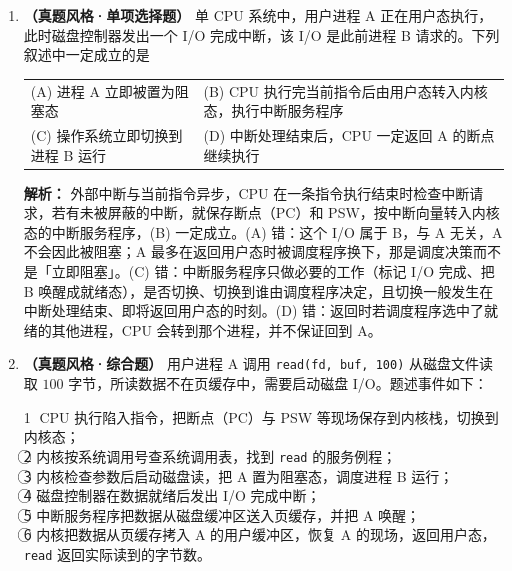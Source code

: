 \begin{enumerate}[resume]
总完成时间为 $110$ ms。CPU 忙碌时间为 $20+10+20+10+20+20=100$ ms，故利用率为
\[
\frac{100}{110}\approx 0.909,
\]
即 $90.9\%$。作为对照，单道执行的利用率为 $100/190\approx52.6\%$：多道的作用正是用另一道作业填补 I/O 造成的 CPU 空档，本题中空闲时间由 $90$ ms 压缩到 $10$ ms。

（3）三道作业都在 $0$ 时刻到达，周转时间就等于完成时刻：J1 为 $70$ ms，J2 为 $90$ ms，J3 为 $110$ ms，平均 $(70+90+110)/3=90$ ms。

\else \answerarea[10] \fi

\vspace{8pt}

\item \textbf{（真题风格·单项选择题）} 单 CPU 系统中，用户进程 A 正在用户态执行，此时磁盘控制器发出一个 I/O 完成中断，该 I/O 是此前进程 B 请求的。下列叙述中一定成立的是
\begin{center}
\begin{tabularx}{\linewidth}{@{}XX@{}}
(A) 进程 A 立即被置为阻塞态 & (B) CPU 执行完当前指令后由用户态转入内核态，执行中断服务程序 \\[4pt]
(C) 操作系统立即切换到进程 B 运行 & (D) 中断处理结束后，CPU 一定返回 A 的断点继续执行
\end{tabularx}
\end{center}

\ifshowsolutions\par\noindent\textbf{解析：} 外部中断与当前指令异步，CPU 在一条指令执行结束时检查中断请求，若有未被屏蔽的中断，就保存断点（PC）和 PSW，按中断向量转入内核态的中断服务程序，(B) 一定成立。(A) 错：这个 I/O 属于 B，与 A 无关，A 不会因此被阻塞；A 最多在返回用户态时被调度程序换下，那是调度决策而不是「立即阻塞」。(C) 错：中断服务程序只做必要的工作（标记 I/O 完成、把 B 唤醒成就绪态），是否切换、切换到谁由调度程序决定，且切换一般发生在中断处理结束、即将返回用户态的时刻。(D) 错：返回时若调度程序选中了就绪的其他进程，CPU 会转到那个进程，并不保证回到 A。\else \answerarea \fi

\vspace{8pt}

\item \textbf{（真题风格·综合题）} 用户进程 A 调用 \texttt{read(fd, buf, 100)} 从磁盘文件读取 $100$ 字节，所读数据不在页缓存中，需要启动磁盘 I/O。题述事件如下：

\textcircled{1} CPU 执行陷入指令，把断点（PC）与 PSW 等现场保存到内核栈，切换到内核态；\\
\textcircled{2} 内核按系统调用号查系统调用表，找到 \texttt{read} 的服务例程；\\
\textcircled{3} 内核检查参数后启动磁盘读，把 A 置为阻塞态，调度进程 B 运行；\\
\textcircled{4} 磁盘控制器在数据就绪后发出 I/O 完成中断；\\
\textcircled{5} 中断服务程序把数据从磁盘缓冲区送入页缓存，并把 A 唤醒；\\
\textcircled{6} 内核把数据从页缓存拷入 A 的用户缓冲区，恢复 A 的现场，返回用户态，\texttt{read} 返回实际读到的字节数。


\end{enumerate}
